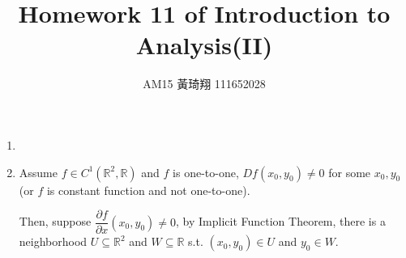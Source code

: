 \documentclass[12pt]{article}
\title{Homework 11 of Introduction to Analysis(II)}
\author{AM15 黃琦翔 111652028}
\begin{document}
\maketitle
\begin{enumerate}
    \item 

    \item Assume $f \in C^1(\mathbb{R}^2, \mathbb{R})$ and $f$ is one-to-one, $Df(x_0, y_0) \neq 0$ for some $x_0, y_0$
    (or $f$ is constant function and not one-to-one).

    Then, suppose $\dfrac{\partial f}{\partial x}(x_0, y_0) \neq 0$,
    by Implicit Function Theorem, there is a neighborhood $U \subseteq \mathbb{R}^2$ and $W \subseteq \mathbb{R}$ s.t. $(x_0, y_0) \in U$ and $y_0 \in W$.
\end{enumerate}
\end{document}
